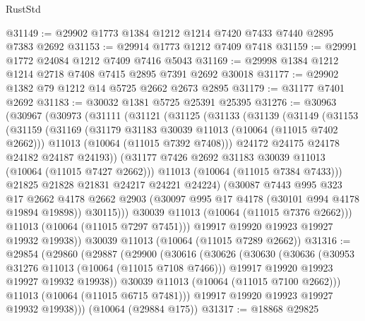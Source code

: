 \begin{lexlean}{RustStd}
\begin{coremodule}
@31149 := @29902 @1773 @1384 @1212 @1214 @7420 @7433 @7440 @2895 @7383 @2692
@31153 := @29914 @1773 @1212 @7409 @7418
@31159 := @29991 @1772 @24084 @1212 @7409 @7416 @5043
@31169 := @29998 @1384 @1212 @1214 @2718 @7408 @7415 @2895 @7391 @2692 @30018
@31177 := @29902 @1382 @79 @1212 @14 @5725 @2662 @2673 @2895
@31179 := @31177 @7401 @2692
@31183 := @30032 @1381 @5725 @25391 @25395
@31276 := @30963
    (@30967
      (@30973
        (@31111
          (@31121
            (@31125
              (@31133
                (@31139
                  (@31149
                    (@31153
                      (@31159
                        (@31169
                          (@31179 @31183 @30039 @11013 (@10064 (@11015 @7402 @2662)))
                          @11013
                          (@10064 (@11015 @7392 @7408)))
                        @24172
                        @24175
                        @24178
                        @24182
                        @24187
                        @24193))
                    (@31177 @7426 @2692 @31183 @30039 @11013 (@10064 (@11015 @7427 @2662)))
                    @11013
                    (@10064 (@11015 @7384 @7433)))
                  @21825
                  @21828
                  @21831
                  @24217
                  @24221
                  @24224)
                (@30087
                  @7443
                  @995
                  @323
                  @17
                  @2662
                  @4178
                  @2662
                  @2903
                  (@30097 @995 @17 @4178 (@30101 @994 @4178 @19894 @19898))
                  @30115)))
            @30039
            @11013
            (@10064 (@11015 @7376 @2662)))
          @11013
          (@10064 (@11015 @7297 @7451)))
        @19917
        @19920
        @19923
        @19927
        @19932
        @19938))
    @30039
    @11013
    (@10064 (@11015 @7289 @2662))
@31316 := @29854
    (@29860
      (@29887
        (@29900
          (@30616
            (@30626
              (@30630
                (@30636
                  (@30953 @31276 @11013 (@10064 (@11015 @7108 @7466)))
                  @19917
                  @19920
                  @19923
                  @19927
                  @19932
                  @19938))
              @30039
              @11013
              (@10064 (@11015 @7100 @2662)))
            @11013
            (@10064 (@11015 @6715 @7481)))
          @19917
          @19920
          @19923
          @19927
          @19932
          @19938)))
    (@10064 (@29884 @175))
@31317 := @18868 @29825

\end{coremodule}
\end{lexlean}
